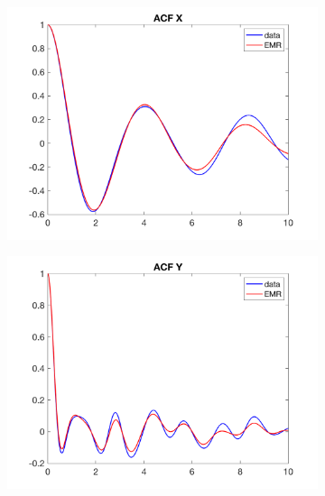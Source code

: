 \documentclass[12pt]{article}
\begin{document}
\begin{figure}[H]
	\centering
	\begin{subfigure}[b]{0.3\textwidth}
		\centering
		\includegraphics[width=\textwidth]{plots/l84l63/emracfxl84025.png}
	\end{subfigure}
	\hfill
	\begin{subfigure}[b]{0.3\textwidth}
		\centering
		\includegraphics[width=\textwidth]{plots/l84l63/emracfyl84025.png}
	\end{subfigure}
	\hfill
	\begin{subfigure}[b]{0.3\textwidth}
		\centering

\end{subfigure}
\end{figure}
\end{document}
